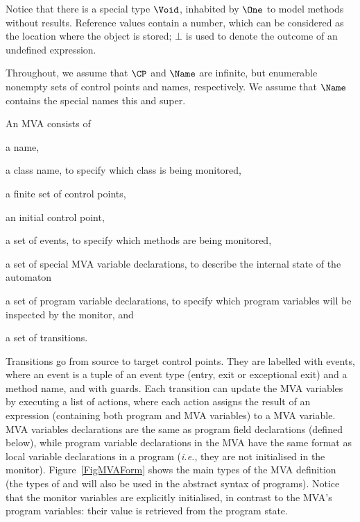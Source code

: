 Notice that there is a special type \(\Void\), inhabited by \(\One\)
to model methods without results. Reference values contain a number,
which can be considered as the location where the object is stored;
\(\bot\) is used to denote the outcome of an undefined expression.

Throughout, we assume that \(\CP\) and \(\Name\) are infinite, but
enumerable nonempty sets of control points and names, respectively. We
assume that \(\Name\) contains the special names \textsf{this} and
\textsf{super}.


An MVA consists of
\begin{inparaenum}
\item a name,
\item a class name, to specify which class is being monitored,
\item a finite set of control points,
\item an initial control point,
\item a set of events, to specify which methods are being monitored,
\item a set of special MVA variable declarations, to describe %
the internal state of the automaton
\item a set of program variable declarations, to specify which
program variables will be inspected by the monitor, and
\item a set of transitions.
\end{inparaenum}
Transitions go from source to target control points. They are labelled
with events, where an event is a tuple of an event type (entry, exit
or exceptional exit) and a method name, and with guards. Each
transition can update the MVA variables by executing a list of
actions, where each action assigns the result of an expression
(containing both program and MVA variables) to a MVA variable. MVA
variables declarations are the same as program field declarations
(defined below), while program variable declarations in the MVA have
the same format as local variable declarations in a program
(\emph{i.e.}, they are not initialised in the
monitor). Figure~\ref{FigMVAForm} shows the main types of the MVA
definition (the types of \FieldDecl and \LocalVarDecl will also be
used in the abstract syntax of programs).  Notice that the monitor
variables are explicitly initialised, in contrast to the MVA's program
variables: their value is retrieved from the program state.

